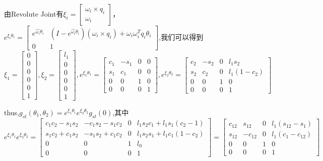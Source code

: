 \documentclass{ctexart}
\begin{document}
由Revolute Joint有$\xi_i= \begin{bmatrix}
	\omega_i \times q_i \\
	\omega_i
\end{bmatrix}$，$e^{\xi_i \theta_i}=\begin{bmatrix}
	e^{\hat{\omega_i}\theta_i} & (I - e^{\hat{\omega_i}\theta_i})(\omega_i \times q_i) + \omega_i \omega_i^T q_i \theta_i \\
	0 & 1
\end{bmatrix}
$,我们可以得到
\begin{equation*}
	\xi_1 = \begin{bmatrix}
		0 \\
		0 \\
		0 \\
		0 \\
		0 \\
		1
	\end{bmatrix},\xi_2 = \begin{bmatrix}
		l_1\\
		0 \\
		0 \\
		0 \\
		0 \\
		1
	\end{bmatrix},
	e^{\xi_1 \theta_1} = \begin{bmatrix}
		c_1 & -s_1 & 0 & 0 \\
		s_1 & c_1 & 0 & 0 \\
		0 & 0 & 1 & 0 \\
		0 & 0 & 0 & 1
	\end{bmatrix},e^{\xi_2 \theta_2} = \begin{bmatrix}
		c_2 & -s_2 & 0 & l_1s_2 \\
		s_2 & c_2 & 0 & l_1(1-c_2) \\
		0 & 0 & 1 & 0 \\
		0 & 0 & 0 & 1
	\end{bmatrix}
\end{equation*}

thus,$g_{st}(\theta_1,\theta_2)=e^{\xi_1 \theta_1}e^{\xi_2 \theta_2}g_{st}(0)$,其中
\begin{equation*}
	e^{\xi_1 \theta_1}e^{\xi_2 \theta_2} = \begin{bmatrix}
		c_1c_2-s_1s_2 & -c_1s_2-s_1c_2 & 0 & l_1s_2c_1+l_1s_1(c_2-1) \\
		s_1c_2+c_1s_2 & -s_1s_2+c_1c_2 & 0 & l_1s_2s_1+l_1c_1(1-c_2) \\
		0 & 0 & 1 & l_0 \\
		0 & 0 & 0 & 1
	\end{bmatrix}
	=\begin{bmatrix}
		c_{12} & s_{12} & 0 & l_1(s_{12}-s_1)\\
		s_{12} & -c_{12} & 0 & l_1(c_1-c_{12})\\
		0 & 0 & 1 & 0 \\
		0 & 0 & 0 & 1
	\end{bmatrix}
\end{equation*}
\end{document}
